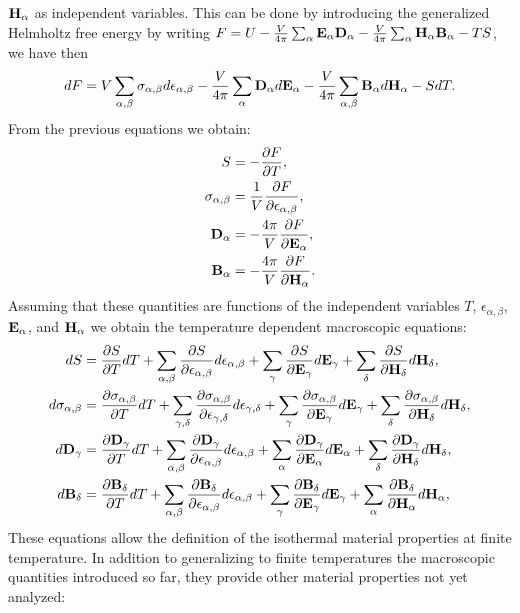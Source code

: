 \documentclass[12pt,a4paper,twoside]{report}
\begin{document}
{${\bf H}_\alpha$ as independent variables.
This can be done by introducing the generalized Helmholtz free energy 
by writing
$F=U- {V \over 4 \pi} \sum_{\alpha} {\bf E}_\alpha {\bf D}_\alpha -
{V \over 4 \pi} \sum_{\alpha} {\bf H}_\alpha {\bf B}_\alpha - TS $, we 
have then
\begin{equation}
dF = V \sum_{\alpha,\beta} \sigma_{\alpha,\beta} d \epsilon_{\alpha,\beta}
- {V \over 4 \pi} \sum_\alpha {\bf D}_\alpha d {\bf E}_\alpha - 
{V \over 4 \pi} \sum_{\alpha,\beta} {\bf B}_{\alpha} d {\bf H}_\alpha - S dT.
\end{equation}
From the previous equations we obtain:
\begin{align}
S&=-{\partial F \over \partial T}, \\
\sigma_{\alpha,\beta}&= {1\over V}
{\partial F \over \partial \epsilon_{\alpha,\beta}}, \\
{\bf D}_{\alpha}&= -{4 \pi \over V}
{\partial F \over \partial {\bf E}_{\alpha}}, \\
{\bf B}_{\alpha}&= -{4 \pi \over V}
{\partial F \over \partial {\bf H}_{\alpha}}.
\end{align}
Assuming that these quantities are functions of the independent variables
$T$, $\epsilon_{\alpha,\beta}$, ${\bf E}_\alpha$, and ${\bf H}_\alpha$ we
obtain the temperature dependent macroscopic equations:
\begin{align}
dS&= {\partial S \over \partial T} dT+\sum_{\alpha,\beta}
{\partial S \over \partial \epsilon_{\alpha,\beta}}d\epsilon_{\alpha,\beta}
+\sum_\gamma{\partial S \over \partial {\bf E}_{\gamma}}d{\bf E}_{\gamma}+ 
\sum_\delta{\partial S \over \partial {\bf H}_{\delta}}d{\bf H}_{\delta}, \\
d\sigma_{\alpha,\beta}&=
{\partial \sigma_{\alpha,\beta} \over \partial T} dT+\sum_{\gamma,\delta}
{\partial \sigma_{\alpha,\beta} \over \partial 
\epsilon_{\gamma,\delta}}d\epsilon_{\gamma,\delta}
+\sum_\gamma{\partial \sigma_{\alpha,\beta} \over \partial 
{\bf E}_{\gamma}}d{\bf E}_{\gamma}+ 
\sum_\delta{\partial \sigma_{\alpha,\beta} \over \partial 
{\bf H}_{\delta}}d{\bf H}_{\delta}, \\
d{\bf D}_\gamma&=
{\partial  {\bf D}_\gamma \over \partial T} dT+\sum_{\alpha,\beta}
{\partial {\bf D}_\gamma \over \partial \epsilon_{\alpha,\beta}}
d\epsilon_{\alpha,\beta}
+\sum_\alpha{\partial {\bf D}_\gamma \over \partial {\bf E}_{\alpha}}d{\bf E}_{\alpha}+ 
\sum_\delta{\partial {\bf D}_\gamma \over \partial {\bf H}_{\delta}}d{\bf H}_{\delta}, \\
d{\bf B}_\delta&=
{\partial {\bf B}_\delta \over \partial T} dT+\sum_{\alpha,\beta}
{\partial {\bf B}_\delta \over \partial \epsilon_{\alpha,\beta}}
d\epsilon_{\alpha,\beta}
+\sum_\gamma{\partial {\bf B}_\delta \over \partial {\bf E}_{\gamma}}
d{\bf E}_{\gamma}+ 
\sum_\alpha{\partial {\bf B}_\delta \over \partial {\bf H}_{\alpha}}
d{\bf H}_{\alpha}, 
\end{align}
These equations allow the definition of the isothermal material properties 
at finite temperature. In addition to generalizing to finite temperatures
the macroscopic quantities introduced so far, they provide other material 
properties not yet analyzed:

}
\end{document}
